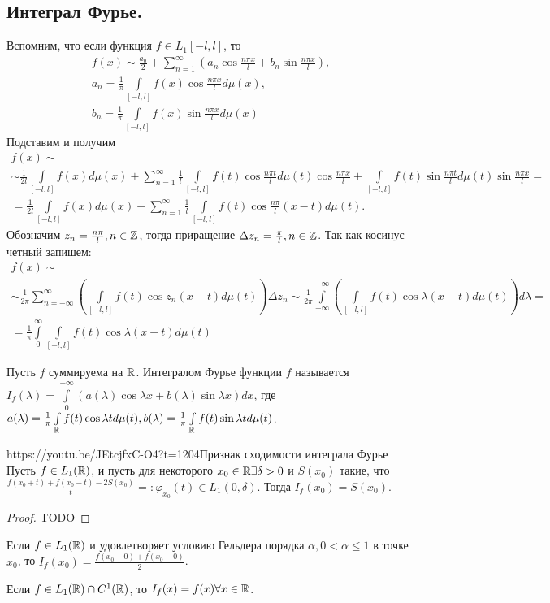 \subsection{Интеграл Фурье.}
Вспомним, что если функция $f\in L_1[-l,l]$, то 
\begin{align*}
	f(x)\sim\frac{a_0}{2}+\sum\limits_{n=1}^\infty \left(a_n\cos\frac{n\pi x}{l}+b_n\sin\frac{n\pi x}{l}\right),\\
	a_n=\frac{1}{\pi}\int\limits_{[-l,l]}f(x)\cos\frac{n\pi x}{l}d\mu(x),\\
	b_n=\frac{1}{\pi}\int\limits_{[-l,l]}f(x)\sin\frac{n\pi x}{l}d\mu(x)
\end{align*}
Подставим и получим
\begin{multline*}
	f(x)\sim\\\sim\frac{1}{2l}\int\limits_{[-l,l]}f(x)d\mu(x)+\sum\limits_{n=1}^\infty\frac{1}{l}\int\limits_{[-l,l]}f(t)\cos\frac{n\pi t}{l}d\mu(t)\cos\frac{n\pi x}{l}+\int\limits_{[-l,l]}f(t)\sin\frac{n\pi t}{l}d\mu(t)\sin\frac{n\pi x}{l}=\\=
	\frac{1}{2l}\int\limits_{[-l,l]}f(x)d\mu(x)+\sum\limits_{n=1}^\infty\frac{1}{l}\int\limits_{[-l,l]}f(t)\cos\frac{n\pi}{l}(x-t)d\mu(t).
\end{multline*}
Обозначим $z_n=\frac{n\pi}{l}, n\in\mathbb{Z}$, тогда приращение $\Delta z_n=\frac{\pi}{l}, n\in\mathbb{Z}$. Так как косинус четный запишем:
\begin{multline*}
	f(x)\sim\\\sim\frac{1}{2\pi}\sum\limits_{n=-\infty}^\infty\left(\int\limits_{[-l,l]}f(t)\cos z_n(x-t)d\mu(t) \right)\Delta z_n\sim\frac{1}{2\pi}\int\limits_{-\infty}^{+\infty}\left(\int\limits_{[-l,l]} f(t)\cos\lambda(x-t)d\mu(t)\right)d\lambda=\\=\frac{1}{\pi}\int\limits_0^\infty\int\limits_{[-l,l]}f(t)\cos\lambda(x-t)d\mu(t)
\end{multline*}

\begin{Def}
	Пусть $f$ суммируема на $\mathbb{R}$. Интегралом Фурье функции $f$ называется $I_f(\lambda)=\int\limits_0^{+\infty}(a(\lambda)\cos\lambda x+b(\lambda)\sin\lambda x)dx$, где $a(\lambda)=\frac{1}{\pi}\int\limits_{\mathbb{R}} f(t)\cos\lambda td\mu(t),
	b(\lambda)=\frac{1}{\pi}\int\limits_{\mathbb{R}} f(t)\sin\lambda td\mu(t)$.
\end{Def}

\begin{linkthm}{https://youtu.be/JEtcjfxC-O4?t=1204}{Признак сходимости интеграла Фурье}\ \\
	Пусть $f\in L_1(\mathbb{R})$,  и пусть для некоторого $x_0\in \mathbb{R} \exists\delta>0$ и $S(x_0)$ такие, что $\frac{f(x_0+t)+f(x_0-t)-2S(x_0)}{t}=:\varphi_{x_0}(t)\in L_1(0,
\delta)$. Тогда $I_f(x_0)=S(x_0)$.
\end{linkthm}
\begin{proof}
TODO
\end{proof}
\begin{corollary}
	Если $f\in L_1(\mathbb{R})$ и удовлетворяет условию Гельдера порядка $\alpha, 0<\alpha\leqslant 1$ в точке $x_0$, то $I_f(x_0)=\frac{f(x_0+0)+f(x_0-0)}{2}$.
	
	Если $f\in L_1(\mathbb{R})\cap C^1(\mathbb{R})$, то $I_f(x)=f(x)\forall x\in\mathbb{R}$.
\end{corollary}


